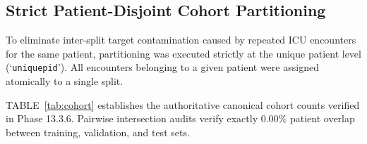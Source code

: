 \documentclass[conference]{IEEEtran}
\begin{document}
\subsection{Strict Patient-Disjoint Cohort Partitioning}
To eliminate inter-split target contamination caused by repeated ICU encounters for the same patient, partitioning was executed strictly at the unique patient level (`\texttt{uniquepid}'). All encounters belonging to a given patient were assigned atomically to a single split.

TABLE~\ref{tab:cohort} establishes the authoritative canonical cohort counts verified in Phase 13.3.6. Pairwise intersection audits verify exactly $0.00\%$ patient overlap between training, validation, and test sets.

\begin{table}[!t]
\centering
\caption{Authoritative Clinical 24-Hour Landmark Cohort Statistics Across Patient-Disjoint Partitions}
\label{tab:cohort}
\end{table}
\end{document}
